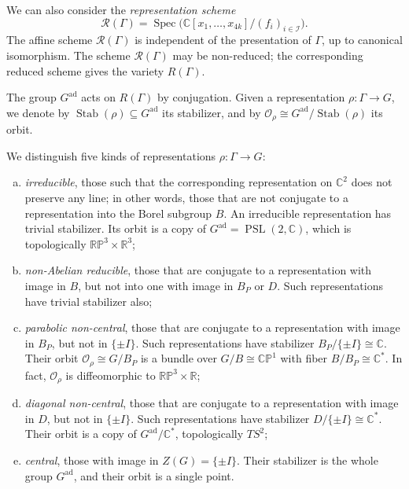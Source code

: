 \documentclass [11pt]{amsart}
\theoremstyle{remark}
\def\rr {{\mathbb{R}}}
\def\cc {{\mathbb{C}}}
\def\C{\cc}
\def\R{\rr}
\def\I {\mathcal{I}}
\def\rp {\mathbb{RP}}
\def\O{\mathcal{O}}
\def\Gad{G^{\operatorname{ad}}}
\def\psl {{\operatorname{PSL}(2, \cc)}}
\def\Rep {R}
\def\Rs {\mathscr{R}}
\def\O {\mathcal{O}}
\def\stab{\operatorname{Stab}}
\begin{document}
We can also consider the {\em representation scheme}
\begin{equation}
\label{eq:Spec}
 \Rs(\Gamma) = \operatorname{Spec} \bigl( \C[x_1, \dots, x_{4k}] / (f_i)_{i \in \I} \bigr).
 \end{equation}
The affine scheme $\Rs(\Gamma)$ is independent of the presentation of $\Gamma$, up to canonical isomorphism. The scheme $\Rs(\Gamma)$ may be non-reduced; the corresponding reduced scheme gives the variety $\Rep(\Gamma)$.

The group $\Gad$ acts on $\Rep(\Gamma)$ by conjugation. Given a representation $\rho: \Gamma \to G$, we denote by $\stab(\rho) \subseteq \Gad$ its stabilizer, and by $\O_{\rho} \cong \Gad/\stab(\rho)$ its orbit.

We distinguish five kinds of representations $\rho: \Gamma \to G$:
\begin{enumerate}[(a)]
\item {\em irreducible}, those such that the corresponding representation on $\C^2$ does not preserve any line; in other words, those that are not conjugate to a representation into the Borel subgroup $B$. An irreducible representation has trivial stabilizer. Its orbit is a copy of $\Gad=\psl$, which is topologically $\rp^3 \times \R^3$;\smallskip

\item {\em non-Abelian reducible}, those that are conjugate to a representation with image in $B$, but not into one with image in $B_{P}$ or $D$. Such representations have trivial stabilizer also;\smallskip

\item {\em parabolic non-central}, those that are conjugate to a representation with image in $B_{P}$, but not in $\{\pm I\}$. Such representations have stabilizer $B_{P}/\{\pm I\} \cong \C$. Their orbit $\O_{\rho} \cong G/B_P$ is a bundle over $G/B \cong \mathbb{CP}^1$ with fiber $B/B_P \cong \C^*$. In fact, $\O_{\rho}$ is diffeomorphic to $\rp^3 \times \R$;\smallskip

\item {\em diagonal non-central}, those that are conjugate to a representation with image in $D$, but not in $\{\pm I\}$. Such representations have stabilizer $D/\{\pm I\} \cong \C^*$. Their orbit is a copy of $\Gad/\C^*$, topologically $TS^2$;\smallskip

\item {\em central}, those with image in $Z(G)=\{\pm I\}$. Their stabilizer is the whole group $\Gad$, and their orbit is a single point. \smallskip
\end{enumerate}
\end{document}
